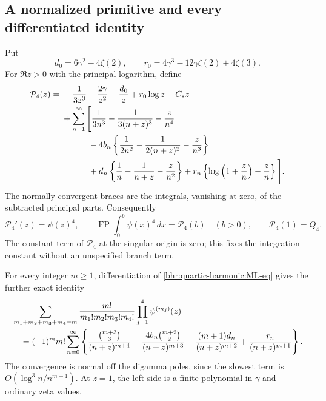 \documentclass[11pt]{article}
\numberwithin{equation}{section}
\theoremstyle{plain}
\theoremstyle{definition}
\theoremstyle{remark}
\begin{document}
\subsection{A normalized primitive and every differentiated identity}

Put
\[
 d_0=6\gamma^2-4\zeta(2),\qquad
 r_0=4\gamma^3-12\gamma\zeta(2)+4\zeta(3).
\]
For $\Re z>0$ with the principal logarithm, define
\begin{align}
 \mathcal P_4(z)={}&-\frac1{3z^3}-\frac{2\gamma}{z^2}
                      -\frac{d_0}{z}+r_0\log z+C_*z\notag\\
 &+\sum_{n=1}^{\infty}\Bigg[
   \frac1{3n^3}-\frac1{3(n+z)^3}-\frac z{n^4}\notag\\
 &\hspace{11mm}-4b_n\left\{\frac1{2n^2}-\frac1{2(n+z)^2}
                                      -\frac z{n^3}\right\}\notag\\
 &\hspace{11mm}+d_n\left\{\frac1n-\frac1{n+z}-\frac z{n^2}\right\}
       +r_n\left\{\log\left(1+\frac zn\right)-\frac zn\right\}
                                      \Bigg].
 \label{bhr:quartic-harmonic:primitive}
\end{align}
The normally convergent braces are the integrals, vanishing at zero,
of the subtracted principal parts. Consequently
\[
 \mathcal P_4'(z)=\psi(z)^4,\qquad
 \operatorname{FP}\int_0^b\psi(x)^4\,dx=\mathcal P_4(b)
      \quad(b>0),\qquad \mathcal P_4(1)=Q_4.
\]
The constant term of $\mathcal P_4$ at the singular origin is zero;
this fixes the integration constant without an unspecified branch term.

For every integer $m\ge1$, differentiation of
\eqref{bhr:quartic-harmonic:ML-eq} gives the further exact identity
\begin{align}
 &\sum_{m_1+m_2+m_3+m_4=m}
   \frac{m!}{m_1!m_2!m_3!m_4!}
      \prod_{j=1}^4\psi^{(m_j)}(z)\notag\\
 &\quad=(-1)^m m!\sum_{n=0}^{\infty}
 \left\{
  \frac{\binom{m+3}{3}}{(n+z)^{m+4}}
  -\frac{4b_n\binom{m+2}{2}}{(n+z)^{m+3}}
  +\frac{(m+1)d_n}{(n+z)^{m+2}}
  +\frac{r_n}{(n+z)^{m+1}}
 \right\}.
 \label{bhr:quartic-harmonic:derivatives}
\end{align}
The convergence is normal off the digamma poles, since the slowest
term is $O(\log^3n/n^{m+1})$. At $z=1$, the left side is a finite
polynomial in $\gamma$ and ordinary zeta values.
\end{document}
